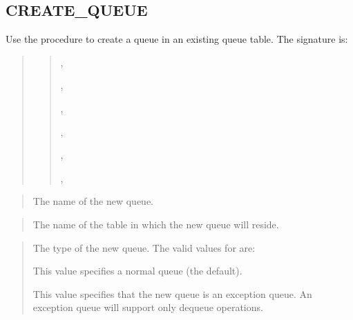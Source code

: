 \documentclass[letterpaper,10pt,english,openany,oneside]{sphinxmanual}
\begin{document}
\subsection{CREATE\_QUEUE}
\label{\detokenize{create_queue::doc}}\label{\detokenize{create_queue:create-queue}}
Use the  procedure to create a queue in an existing queue
table. The signature is:
\begin{quote}

\begin{quote}


,

,

,


,

,

,

\end{quote}
\end{quote}


\begin{quote}

The name of the new queue.
\end{quote}

\begin{quote}

The name of the table in which the new queue will reside.
\end{quote}

\begin{quote}

The type of the new queue. The valid values for 
are:

 \textendash{} This value specifies a normal queue (the
default).

 \textendash{} This value specifies that the new
queue is an exception queue. An exception queue will support only
dequeue operations.
\end{quote}
\end{document}
